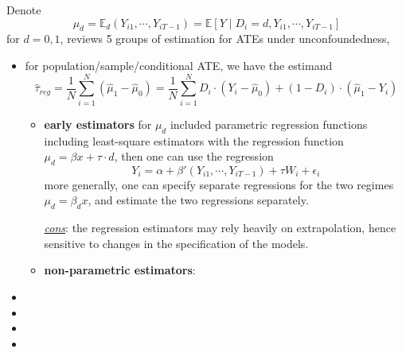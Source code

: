\documentclass[twoside]{article}
\begin{document}
Denote 
$$\mu_d = \mathbb{E}_d(Y_{i1},\cdots,Y_{iT-1}) = \mathbb{E}\left[Y\mid D_i=d,Y_{i1},\cdots,Y_{iT-1} \right]$$
for $d=0,1$, \citet{imbens2004nonparametric} reviews 5 groups of estimation for ATEs under unconfoundedness, 
\begin{itemize}
    \item {} for population/sample/conditional ATE, we have the estimand
    \begin{equation*}
        \hat{\tau}_{reg} = \frac{1}{N} \sum^N_{i=1}\left(\hat{\mu}_1-\hat{\mu}_0\right) = \frac{1}{N}\sum^N_{i=1}D_i\cdot\left(Y_i - \hat{\mu}_0\right) + (1-D_i)\cdot\left(\hat{\mu}_1-Y_i\right)
    \end{equation*}
    \begin{itemize}
        \item \textbf{early estimators} for $\mu_d$ included parametric regression functions including least-square estimators with the regression function $\mu_d = \beta x+\tau\cdot d$, then one can use the regression $$ Y_i =\alpha + \beta'\left(Y_{i1},\cdots,Y_{iT-1}\right) + \tau W_i +\epsilon_i $$
        more generally, one can specify separate regressions for the two regimes $\mu_d = \beta_d x$, and estimate the two regressions separately.

        \underline{\textit{cons}}: the regression estimators may rely heavily on extrapolation, hence sensitive to changes in the specification of the models.
        \item \textbf{non-parametric estimators}: 
    \end{itemize}
    \item {}
    \item {}
    \item {}
    \item {}
\end{itemize}


\newpage


\end{document}
